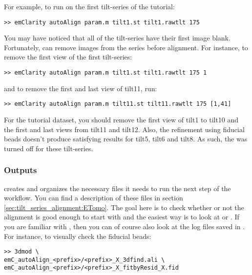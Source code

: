 For example, to run  on the first tilt-series of the tutorial:
\begin{lstlisting}
>> emClarity autoAlign param.m tilt1.st tilt1.rawtlt 175
\end{lstlisting}


You may have noticed that all of the tilt-series have their first image blank. Fortunately,  can remove images from the series before alignment. For instance, to remove the first view of the first tilt-series:
\begin{lstlisting}
>> emClarity autoAlign param.m tilt1.st tilt1.rawtlt 175 1
\end{lstlisting}
and to remove the first and last view of tilt11, run:
\begin{lstlisting}
>> emClarity autoAlign param.m tilt11.st tilt11.rawtlt 175 [1,41]
\end{lstlisting}
\begin{note}For the tutorial dataset, you should remove the first view of tilt1 to tilt10 and the first and last views from tilt11 and tilt12. Also, the refinement using fiducial beads doesn't produce satisfying results for tilt5, tilt6 and tilt8. As such, the  was turned off for these tilt-series.
\end{note}


\subsubsection{Outputs}

{\emClarity} creates and organizes the necessary files it needs to run the next step of the workflow. You can find a description of these files in section \ref{sec:tilt_series_alignment:ETomo}. The goal here is to check whether or not the alignment is good enough to start with and the easiest way is to look at  or .
If you are familiar with {\ETomo}, then you can of course also look at the log files saved in . For instance, to visually check the fiducial beads:
\begin{lstlisting}
>> 3dmod \
emC_autoAlign_<prefix>/<prefix>_X_3dfind.ali \
emC_autoAlign_<prefix>/<prefix>_X_fitbyResid_X.fid
\end{lstlisting}

